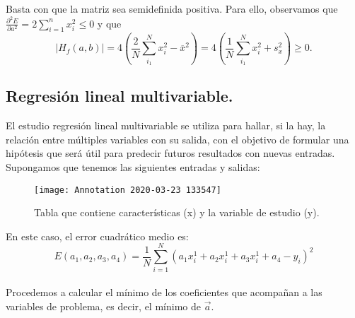 \documentclass[a4paper,11pt]{article}
\begin{document}
\noindent
Basta con que la matriz sea semidefinida positiva. Para ello, observamos que $\frac{\partial^2 E}{\partial a^2}= 2 \sum_{i=1}^n x_{i}^2\leq 0$ y que\\
\begin{equation}
|H_f(a,b)|=4\left(\frac{2}{N}\sum_{i_1}^N x_i^2-\overline{x}^2\right)=4\left(\frac{1}{N}\sum_{i_1}^N x_i^2+s_x^2\right)\geq 0.
\end{equation}
\subsection{Regresión lineal multivariable.}

El estudio regresión lineal multivariable se utiliza para hallar, si la hay, la relación entre múltiples variables con su salida, con el objetivo de formular una hipótesis que será útil para predecir futuros resultados con nuevas entradas. \\

\noindent
Supongamos que tenemos las siguientes entradas y salidas: 

\begin{figure}[H]
\centering
\texttt{[image: Annotation 2020-03-23 133547]}
\caption{Tabla que contiene características (x) y la variable de estudio (y).}
\end{figure}
\noindent
En este caso, el error cuadrático medio es:
\begin{equation}
 E(a_{1},a_{2},a_{3},a_{4})=\frac{1}{N}\sum_{i=1}^{N}(a_{1}x_i^1+a_{2}x_i^1+a_{3}x_i^1+a_{4}-y_{i})^2
\end{equation}
\\Procedemos a calcular el mínimo de los coeficientes que acompañan a las variables de problema, es decir, el mínimo de $\vec{a}$.\\
\end{document}
